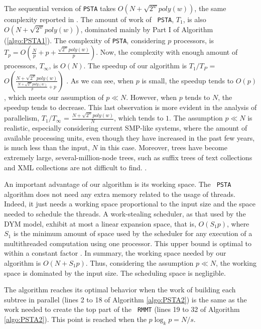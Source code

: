 The sequential version of {\tt PSTA} takes $O(N+\sqrt{2^{w}}poly(w))$,
the same complexity reported in
\cite{Navarro:2014:FFS:2620785.2601073}. The amount of work of {\tt
PSTA}, $T_1$, is also $O(N+\sqrt{2^{w}}poly(w))$, dominated mainly by
Part I of Algorithm (\ref{algo:PSTA1}). The complexity of {\tt PSTA},
considering $p$ processors, is $T_p =
O(\frac{N}{p}+p+\frac{\sqrt{2^{w}}poly(w)}{p})$. Now, the complexity
with enough amount of processors, $T_\infty$, is $O(N)$. The speedup
of our algorithm is $T_1/T_P$ =
$O(\frac{N+\sqrt{2^{w}}poly(w)}{\frac{N+\sqrt{2^{w}}poly(w)}{p}+p})$
. As we can see,
when $p$ is small, the speedup tends to $O(p)$, which meets our
assumption of $p\ll N$. However, when $p$ tends to $N$, the speedup
tends to decrease. This last observation is more evident in the
analysis of parallelism, $T_1/T_{\infty}$ =
$\frac{N+\sqrt{2^{w}}poly(w)}{N}$, which tends to $1$. The assumption
$p\ll N$ is realistic, especially considering current SMP-like
systems, where the amount of available processing units, even though
they have increased in the past few years, is much less than the
input, $N$ in this case. Moreover, trees have become extremely large,
several-million-node trees, such as suffix trees of text collections
and XML collections are not difficult to find. .

An important advantage of our algorithm is its working space. The {\tt
PSTA} algorithm does not need any extra memory related to the usage of
threads. Indeed, it just needs a working space proportional to the
input size and the space needed to schedule the threads. A
work-stealing scheduler, as that used by the DYM model, exhibit at
most a linear expansion space, that is, $O(S_1p)$, where $S_1$ is the
minimum amount of space used by the scheduler for any execution of a
multithreaded computation using one processor. This upper bound is
optimal to within a constant factor
\cite{Blumofe:1999:SMC:324133.324234}. In summary, the working space
needed by our algorithm is $O(N+S_1p)$. Thus, considering the
assumption $p\ll N$, the working space is dominated by the input
size. The scheduling space is negligible.

The algorithm reaches its optimal behavior when the work of building
each subtree in parallel (lines 2 to 18 of Algorithm \ref{algo:PSTA2})
is the same as the work needed to create the top part of the {\tt
RMMT} (lines 19 to 32 of Algorithm \ref{algo:PSTA2}). This point is
reached when the $p\log_{k}p=N/s$. 